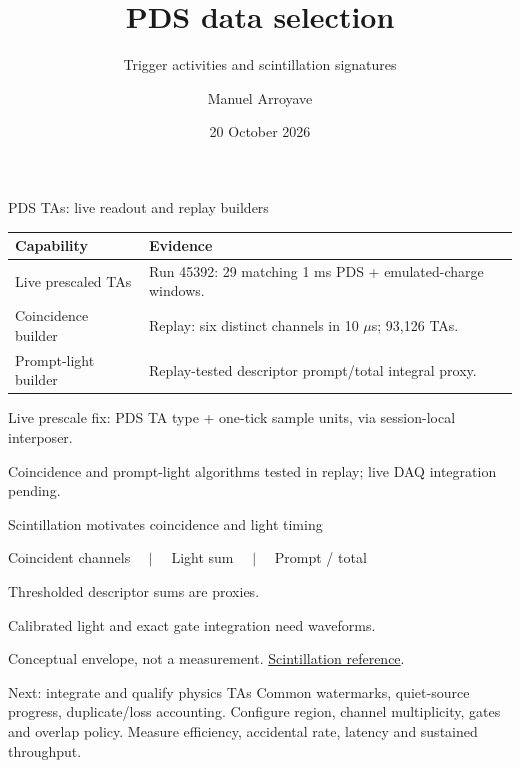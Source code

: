 \documentclass[aspectratio=169,11pt]{beamer}
\title{PDS data selection}
\subtitle{Trigger activities and scintillation signatures}
\author{Manuel Arroyave}
\date{20 October 2026}
\begin{document}
\begin{frame}[plain]\titlepage\end{frame}

\begin{frame}{PDS TAs: live readout and replay builders}
  \renewcommand{\arraystretch}{1.5}
  \begin{tabularx}{\textwidth}{@{}lX@{}}
    \toprule
    Capability & Evidence \\
    \midrule
    Live prescaled TAs & Run 45392: 29 matching 1 ms PDS + emulated-charge windows. \\
    Coincidence builder & Replay: six distinct channels in 10 $\mu$s; 93,126 TAs. \\
    Prompt-light builder & Replay-tested descriptor prompt/total integral proxy. \\
    \bottomrule
  \end{tabularx}
  \bigskip
  {\small\color{DuneTextMuted}Live prescale fix: PDS TA type + one-tick sample units, via session-local interposer.\par
    Coincidence and prompt-light algorithms tested in replay; live DAQ integration pending.}
\end{frame}

\begin{frame}{Scintillation motivates coincidence and light timing}
  \centering
  \par
  \medskip
  Coincident channels $\quad\vert\quad$ Light sum $\quad\vert\quad$ Prompt / total\par
  \medskip
  {\small Thresholded descriptor sums are proxies.\par
    Calibrated light and exact gate integration need waveforms.\par}
  \smallskip
  {\footnotesize\color{DuneTextMuted}Conceptual envelope, not a measurement.
    \href{https://arxiv.org/abs/2203.16134}{Scintillation reference}.}
\end{frame}

\begin{frame}{Next: integrate and qualify physics TAs}
    {Common watermarks, quiet-source progress, duplicate/loss accounting.}
  \medskip
    {Configure region, channel multiplicity, gates and overlap policy.}
  \medskip
    {Measure efficiency, accidental rate, latency and sustained throughput.}
\end{frame}
\end{document}
